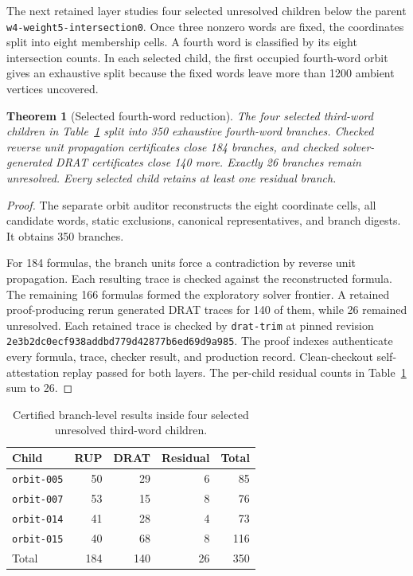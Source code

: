 \documentclass[11pt]{article}
\newtheorem{theorem}{Theorem}
\theoremstyle{definition}
\theoremstyle{remark}
\begin{document}
The next retained layer studies four selected unresolved children below the
parent \texttt{w4-weight5-}\allowbreak\texttt{intersection0}.  Once three
nonzero words are fixed,
the coordinates split into eight membership cells.  A fourth word is
classified by its eight intersection counts.  In each selected child,
the first occupied fourth-word orbit gives an exhaustive split because
the fixed words leave more than 1200 ambient vertices uncovered.

\begin{theorem}[Selected fourth-word reduction]
\label{thm:fourth}
The four selected third-word children in Table~\ref{tab:fourth} split
into 350 exhaustive fourth-word branches.  Checked reverse unit
propagation certificates close 184 branches, and checked
solver-generated DRAT certificates close 140 more.  Exactly 26 branches
remain unresolved.  Every selected child retains at least one residual
branch.
\end{theorem}

\begin{proof}
The separate orbit auditor reconstructs the eight coordinate cells,
all candidate words, static exclusions, canonical representatives, and
branch digests.  It obtains 350 branches.

For 184 formulas, the branch units force a contradiction by reverse
unit propagation.  Each resulting trace is checked against the
reconstructed formula.  The remaining 166 formulas formed the
exploratory solver frontier.  A retained proof-producing rerun generated
DRAT traces for 140 of them, while 26 remained unresolved.  Each
retained trace is checked by \texttt{drat-trim} at pinned revision
\texttt{2e3b2dc0ecf938addbd779d42877b6ed69d9a985}.  The proof indexes
authenticate every formula, trace, checker result, and production
record.  Clean-checkout self-attestation replay passed for both layers.
The per-child residual counts in Table~\ref{tab:fourth} sum to 26.
\end{proof}

\begin{table}[ht]
\centering
\begin{tabular}{@{}lrrrr@{}}
\toprule
Child & RUP & DRAT & Residual & Total \\
\midrule
\texttt{orbit-005} & 50 & 29 & 6 & 85 \\
\texttt{orbit-007} & 53 & 15 & 8 & 76 \\
\texttt{orbit-014} & 41 & 28 & 4 & 73 \\
\texttt{orbit-015} & 40 & 68 & 8 & 116 \\
\midrule
Total & 184 & 140 & 26 & 350 \\
\bottomrule
\end{tabular}
\caption{Certified branch-level results inside four selected unresolved
third-word children.}
\label{tab:fourth}
\end{table}
\end{document}
